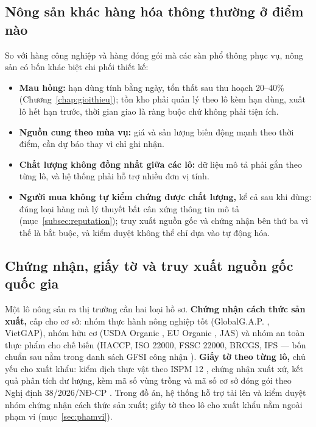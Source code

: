 \subsection{Nông sản khác hàng hóa thông thường ở điểm nào}
\label{subsec:sosanhnongsan}

So với hàng công nghiệp và hàng đóng gói mà các sàn phổ thông phục vụ, nông sản có bốn khác biệt chi phối thiết kế:
\begin{itemize}
    \item \textbf{Mau hỏng:} hạn dùng tính bằng ngày, tổn thất sau thu hoạch 20--40\% (Chương~\ref{chap:gioithieu}); tồn kho phải quản lý theo lô kèm hạn dùng, xuất lô hết hạn trước, thời gian giao là ràng buộc chứ không phải tiện ích.
    \item \textbf{Nguồn cung theo mùa vụ:} giá và sản lượng biến động mạnh theo thời điểm, cần dự báo thay vì chỉ ghi nhận.
    \item \textbf{Chất lượng không đồng nhất giữa các lô:} dữ liệu mô tả phải gắn theo từng lô, và hệ thống phải hỗ trợ nhiều đơn vị tính.
    \item \textbf{Người mua không tự kiểm chứng được chất lượng,} kể cả sau khi dùng: đúng loại hàng mà lý thuyết bất cân xứng thông tin mô tả (mục~\ref{subsec:reputation}); truy xuất nguồn gốc và chứng nhận bên thứ ba vì thế là bắt buộc, và kiểm duyệt không thể chỉ dựa vào tự động hóa.
\end{itemize}

\subsection{Chứng nhận, giấy tờ và truy xuất nguồn gốc quốc gia}
\label{subsec:chungnhan}

Một lô nông sản ra thị trường cần hai loại hồ sơ. \textbf{Chứng nhận cách thức sản xuất,} cấp cho cơ sở: nhóm thực hành nông nghiệp tốt (GlobalG.A.P. \parencite{globalgap_ifa}, VietGAP), nhóm hữu cơ (USDA Organic \parencite{usda_nop}, EU Organic \parencite{eu_organic_2018848}, JAS) và nhóm an toàn thực phẩm cho chế biến (HACCP, ISO 22000, FSSC 22000, BRCGS, IFS --- bốn chuẩn sau nằm trong danh sách GFSI công nhận \parencite{gfsi_cpo}). \textbf{Giấy tờ theo từng lô,} chủ yếu cho xuất khẩu: kiểm dịch thực vật theo ISPM 12 \parencite{ippc_ispm12}, chứng nhận xuất xứ, kết quả phân tích dư lượng, kèm mã số vùng trồng và mã số cơ sở đóng gói theo Nghị định 38/2026/NĐ-CP \parencite{ppd_masovungtrong}. Trong đồ án, hệ thống hỗ trợ tải lên và kiểm duyệt nhóm chứng nhận cách thức sản xuất; giấy tờ theo lô cho xuất khẩu nằm ngoài phạm vi (mục~\ref{sec:phamvi}).

